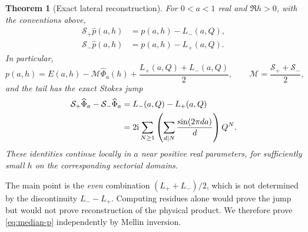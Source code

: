 \documentclass[11pt,a4paper]{article}
\numberwithin{equation}{section}
\newtheorem{theorem}{Theorem}[section]
\theoremstyle{definition}
\theoremstyle{remark}\newtheorem{remark}[theorem]{Remark}
\newcommand{\ii}{\mathrm i}\newcommand{\e}{\mathrm e}
\newcommand{\Sp}{\mathcal S_{+}}\newcommand{\Sm}{\mathcal S_{-}}
\newcommand{\Med}{\mathcal M}\newcommand{\eps}{\varepsilon}
\begin{document}
\begin{theorem}[Exact lateral reconstruction]\label{thm:completion}
For $0<a<1$ real and $\Re h>0$, with the conventions above,
\begin{align}
 \Sp\widehat p(a,h)&=p(a,h)-L_-(a,Q),\label{eq:pplus}\\
 \Sm\widehat p(a,h)&=p(a,h)-L_+(a,Q).\label{eq:pminus}
\end{align}
In particular,
\begin{equation}\label{eq:median-p}
 p(a,h)=E(a,h)-\Med\widehat\Phi_a(h)
                      +\frac{L_+(a,Q)+L_-(a,Q)}2,
 \qquad \Med=\frac{\Sp+\Sm}{2},
\end{equation}
and the tail has the exact Stokes jump
\begin{align}
 \Sp\widehat\Phi_a-\Sm\widehat\Phi_a
 &=L_-(a,Q)-L_+(a,Q)\label{eq:J}\\
 &=2\ii\sum_{N\ge1}\left(\sum_{d\mid N}
                       \frac{\sin(2\pi da)}d\right)Q^N.\notag
\end{align}
These identities continue locally in $a$ near positive real parameters,
for sufficiently small $h$ on the corresponding sectorial domains.
\end{theorem}

The main point is the \emph{even} combination
$(L_++L_-)/2$, which is not determined by the discontinuity
$L_--L_+$. Computing residues alone would prove the jump but would not
prove reconstruction of the physical product. We therefore prove
\eqref{eq:median-p} independently by Mellin inversion.
\end{document}
